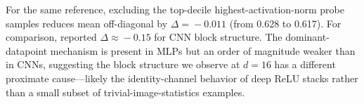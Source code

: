  For the same  reference, excluding the top-decile highest-activation-norm probe samples reduces mean off-diagonal \ckam by $\Delta\!=\!-0.011$ (from 0.628 to 0.617). For comparison, \citet{nguyen2022origins} reported $\Delta \approx\!-0.15$ for CNN block structure. The dominant-datapoint mechanism is present in MLPs but an order of magnitude weaker than in CNNs, suggesting the block structure we observe at $d\!=\!16$ has a different proximate cause---likely the identity-channel behavior of deep ReLU stacks rather than a small subset of trivial-image-statistics examples.
